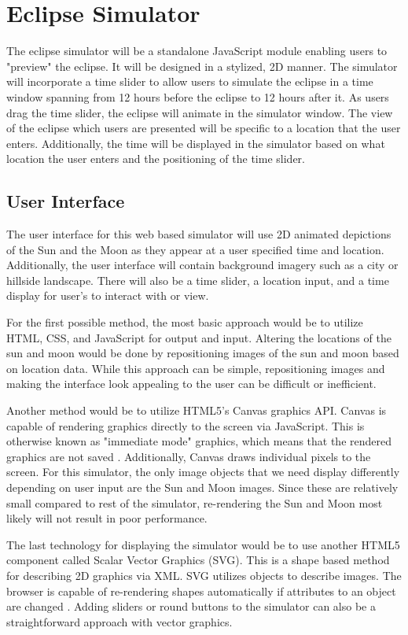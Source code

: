 \documentclass[10pt, onecolumn, draftclsnofoot, letterpaper, compsoc]{IEEEtran}
\begin{document}
\section{Eclipse Simulator}
The eclipse simulator will be a standalone JavaScript module enabling users to
"preview" the eclipse. It will be designed in a stylized, 2D manner.
The simulator will incorporate a time slider to allow users to simulate
the eclipse in a time window spanning from 12 hours before the eclipse to 12
hours after it. As users drag the time slider, the eclipse will animate in the
simulator window. The view of the eclipse which users are presented will be
specific to a location that the user enters. Additionally, the time will be
displayed in the simulator based on what location the user enters and the
positioning of the time slider.

\subsection{User Interface}

The user interface for this web based simulator will use 2D animated depictions
of the Sun and the Moon as they appear at a user specified time and location.
Additionally, the user interface will contain background imagery such as a
city or hillside landscape. There will also be a time slider, a location
input, and a time display for user's to interact with or view.

For the first possible method, the most basic approach would be to utilize
HTML, CSS, and JavaScript for output and input. Altering the locations of the
sun and moon would be done by repositioning images of the sun and moon based on
location data. While this approach can be simple, repositioning images and
making the interface look appealing to the user can be difficult or
inefficient.

Another method would be to utilize HTML5's Canvas graphics API. Canvas is
capable of rendering graphics directly to the screen via JavaScript. This is
otherwise known as "immediate mode" graphics, which means that the rendered
graphics are not saved \cite{SVGvsC}. Additionally, Canvas draws individual
pixels to the screen. For this simulator, the only image objects that we need
display differently depending on user input are the Sun and Moon images.
Since these are relatively small compared to rest of the simulator,
re-rendering the Sun and Moon most likely will not result in poor performance.

The last technology for displaying the simulator would be to use another HTML5
component called Scalar Vector Graphics (SVG). This is a shape based method
for describing 2D graphics via XML.  SVG utilizes objects to describe images.
The browser is capable of re-rendering shapes automatically if attributes to
an object are changed \cite{SVG}. Adding sliders or round buttons to the
simulator can also be a straightforward approach with vector graphics.
\end{document}
